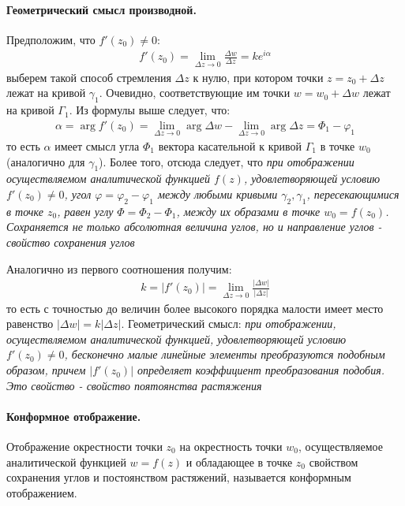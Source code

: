 \documentclass[12pt]{extarticle}
\begin{document}
\paragraph{Геометрический смысл производной.}
Предположим, что $f'(z_{0})\neq 0$:
\begin{eqnarray*}
    f'(z_{0})=\lim\limits_{\Delta z\rightarrow 0}
    \frac{\Delta w}{\Delta z}=ke^{i\alpha}
\end{eqnarray*}
выберем такой способ стремления $\Delta z$ к нулю, при котором точки
$z=z_{0}+\Delta z$ лежат на кривой $\gamma_{1}$. Очевидно,
соответствующие им точки $w=w_{0}+\Delta w$ лежат на кривой
$\Gamma_{1}$. Из формулы выше следует, что:
\begin{eqnarray*}
    \alpha=\arg f'(z_{0})=\lim\limits_{\Delta z\rightarrow 0}\arg\Delta
    w-\lim\limits_{\Delta z\rightarrow 0}\arg\Delta
    z=\Phi_{1}-\varphi_{1}
\end{eqnarray*}
то есть $\alpha$ имеет смысл угла $\Phi_{1}$ вектора касательной к
кривой $\Gamma_{1}$ в точке $w_{0}$ (аналогично для $\gamma_{1}$). Более
того, отсюда следует, что \textit{при отображении осуществляемом
аналитической функцией $f(z)$, удовлетворяющей условию $f'(z_{0})\neq
0$, угол $\varphi=\varphi_{2}-\varphi_{1}$ между любыми кривыми
$\gamma_{2},\gamma_{1}$, пересекающимися в точке $z_{0}$, равен углу
$\Phi=\Phi_{2}-\Phi_{1}$, между их образами в точке $w_{0}=f(z_{0})$.
Сохраняется не только абсолютная величина углов, но и направление углов
- свойство сохранения углов}
\par Аналогично из первого соотношения получим:
\begin{eqnarray*}
    k=|f'(z_{0})|=\lim\limits_{\Delta z\rightarrow 0}\frac{|\Delta
    w|}{|\Delta z|}
\end{eqnarray*}
то есть с точностью до величин более высокого порядка малости имеет
место равенство $|\Delta w|=k|\Delta z|$. Геометрический смысл:
\textit{при отображении, осуществляемом аналитической функцией,
удовлетворяющей условию $f'(z_{0})\neq 0$, бесконечно малые линейные
элементы преобразуются подобным образом, причем $|f'(z_{0})|$ определяет
коэффициент преобразования подобия. Это свойство - свойство поятоянства
растяжения}

\paragraph{Конформное отображение.} 
Отображение окрестности точки $z_{0}$ на окрестность точки $w_{0}$,
осуществляемое аналитической функцией $w=f(z)$ и обладающее в точке
$z_{0}$ свойством сохранения углов и постоянством растяжений, называется
конформным отображением.
\end{document}
